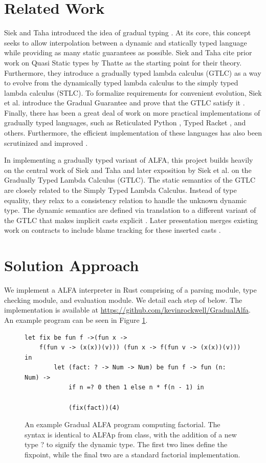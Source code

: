 \documentclass [11pt]{article}
\begin{document}
\section{Related Work}
Siek and Taha introduced the idea of gradual typing \cite{siek2006gradual}. At its core, this concept seeks to allow interpolation between a dynamic and statically typed language while providing as many static guarantees as possible. Siek and Taha cite prior work on Quasi Static types by Thatte \cite{thatte1989quasi} as the starting point for their theory. Furthermore, they introduce a gradually typed lambda calculus (GTLC) as a way to evolve from the dynamically typed lambda calculus to the simply typed lambda calculus (STLC). To formalize requirements for convenient evolution, Siek et al. introduce the Gradual Guarantee and prove that the GTLC satisfy it \cite{siek2015refined}. Finally, there has been a great deal of work on more practical implementations of gradually typed languages, such as Reticulated Python \cite{vitousek2014Reticulated}, Typed Racket \cite{takikawa2015Racket}, and others. Furthermore, the efficient implementation of these languages has also been scrutinized and improved \cite{takikawa2016SoundDead,Vitousek2017BigTypes,MuehlboeckTate2017Nominally,Bauman2017MostlyDead}.

In implementing a gradually typed variant of ALFA, this project builds heavily on the central work of Siek and Taha and later exposition by Siek et al. on the Gradually Typed Lambda Calculus (GTLC). The static semantics of the GTLC are closely related to the Simply Typed Lambda Calculus. Instead of type equality, they relax to a consistency relation to handle the unknown dynamic type. The dynamic semantics are defined via translation to a different variant of the GTLC that makes implicit casts explicit \cite{siek2006gradual}. Later presentation merges existing work on contracts to include blame tracking for these inserted casts \cite{siek2015refined}.

\section{Solution Approach}
We implement a ALFA interpreter in Rust comprising of a parsing module, type checking module, and evaluation module. We detail each step of below. The implementation is available at \url{https://github.com/kevinrockwell/GradualAlfa}. An example program can be seen in Figure \ref{fig:prog}.

\begin{figure}
\centering
\begin{verbatim}
let fix be fun f ->(fun x ->
    f(fun v -> (x(x))(v))) (fun x -> f(fun v -> (x(x))(v))) in
        let (fact: ? -> Num -> Num) be fun f -> fun (n: Num) ->
            if n =? 0 then 1 else n * f(n - 1) in

            (fix(fact))(4)
\end{verbatim}
\caption{An example Gradual ALFA program computing factorial. The syntax is identical to ALFAp from class, with the addition of a new type ? to signify the dynamic type. The first two lines define the fixpoint, while the final two are a standard factorial implementation.}
\label{fig:prog}
\end{figure}
\end{document}
